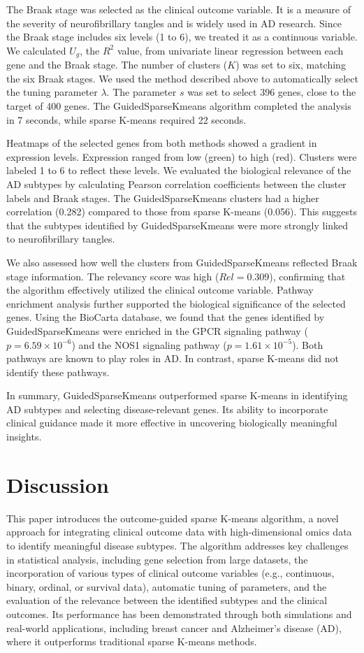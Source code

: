 \documentclass{statsoc}
\begin{document}
The Braak stage was selected as the clinical outcome variable. It is a measure of the severity of neurofibrillary tangles and is widely used in AD research. Since the Braak stage includes six levels (1 to 6), we treated it as a continuous variable. We calculated $U_g$, the $R^2$ value, from univariate linear regression between each gene and the Braak stage. The number of clusters ($K$) was set to six, matching the six Braak stages. We used the method described above to automatically select the tuning parameter $\lambda$. The parameter $s$ was set to select 396 genes, close to the target of 400 genes. The GuidedSparseKmeans algorithm completed the analysis in 7 seconds, while sparse K-means required 22 seconds.

Heatmaps of the selected genes from both methods showed a gradient in expression levels. Expression ranged from low (green) to high (red). Clusters were labeled 1 to 6 to reflect these levels. We evaluated the biological relevance of the AD subtypes by calculating Pearson correlation coefficients between the cluster labels and Braak stages. The GuidedSparseKmeans clusters had a higher correlation (0.282) compared to those from sparse K-means (0.056). This suggests that the subtypes identified by GuidedSparseKmeans were more strongly linked to neurofibrillary tangles.

We also assessed how well the clusters from GuidedSparseKmeans reflected Braak stage information. The relevancy score was high ($Rel = 0.309$), confirming that the algorithm effectively utilized the clinical outcome variable. Pathway enrichment analysis further supported the biological significance of the selected genes. Using the BioCarta database, we found that the genes identified by GuidedSparseKmeans were enriched in the GPCR signaling pathway ($p = 6.59 \times 10^{-6}$) and the NOS1 signaling pathway ($p = 1.61 \times 10^{-5}$). Both pathways are known to play roles in AD. In contrast, sparse K-means did not identify these pathways.

In summary, GuidedSparseKmeans outperformed sparse K-means in identifying AD subtypes and selecting disease-relevant genes. Its ability to incorporate clinical guidance made it more effective in uncovering biologically meaningful insights.

\section{Discussion}
This paper introduces the outcome-guided sparse K-means algorithm, a novel approach for integrating clinical outcome data with high-dimensional omics data to identify meaningful disease subtypes. The algorithm addresses key challenges in statistical analysis, including gene selection from large datasets, the incorporation of various types of clinical outcome variables (e.g., continuous, binary, ordinal, or survival data), automatic tuning of parameters, and the evaluation of the relevance between the identified subtypes and the clinical outcomes. Its performance has been demonstrated through both simulations and real-world applications, including breast cancer and Alzheimer’s disease (AD), where it outperforms traditional sparse K-means methods.
\end{document}

